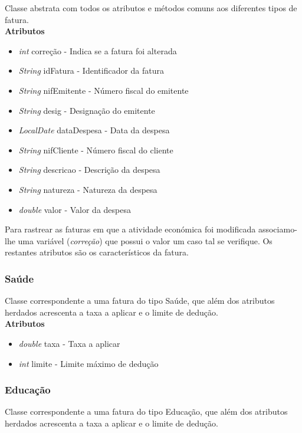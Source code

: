\documentclass[10pt,a4paper]{article}
\begin{document}
Classe abstrata com todos os atributos e métodos comuns aos diferentes tipos de fatura.\\

{\bf{Atributos}}
\begin{itemize}
 \item \textit{int} correção - Indica se a fatura foi alterada
 \item \textit{String} idFatura - Identificador da fatura
 \item \textit{String} nifEmitente - Número fiscal do emitente
 \item \textit{String} desig - Designação do emitente
 \item \textit{LocalDate} dataDespesa - Data da despesa 
 \item \textit{String} nifCliente - Número fiscal do cliente
 \item \textit{String} descricao - Descrição da despesa
 \item \textit{String} natureza - Natureza da despesa
 \item \textit{double} valor - Valor da despesa
\end{itemize}

Para rastrear as faturas em que a atividade económica foi modificada associamo-lhe uma variável (\textit{correção}) que possui o valor um caso tal se verifique. Os restantes atributos são os característicos da fatura.

\subsubsection{Saúde}

Classe correspondente a uma fatura do tipo Saúde, que além dos atributos herdados acrescenta a taxa a aplicar e o limite de dedução.\\

{\bf{Atributos}}
\begin{itemize}
 \item \textit{double} taxa - Taxa a aplicar
 \item \textit{int} limite - Limite máximo de dedução
\end{itemize}

\subsubsection{Educação}

Classe correspondente a uma fatura do tipo Educação, que além dos atributos herdados acrescenta a taxa a aplicar e o limite de dedução.\\
\end{document}
